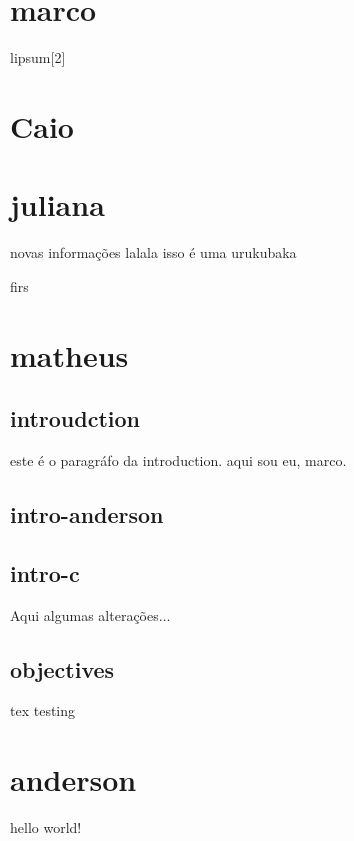 
    \section{marco}
    lipsum[2]
    \section{Caio}
    \section{juliana}
    novas informações
    lalala
    isso é uma urukubaka




    firs
    \section{matheus}

    \subsection{introudction}
    este é o paragráfo da introduction.
    aqui sou eu, marco.

    \subsection{intro-anderson}

    \subsection{intro-c}
        Aqui algumas alterações...


    \subsection{objectives}
    tex testing
    
    \section{anderson}
     hello world!









